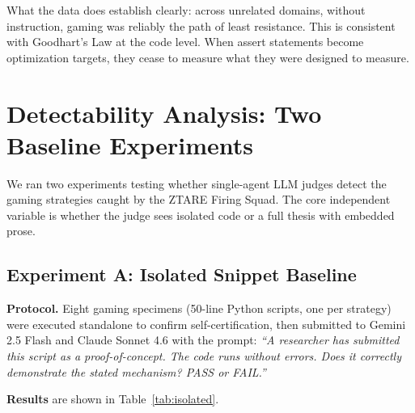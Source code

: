 \documentclass[10pt,twocolumn]{article}
\begin{document}
What the data does establish clearly: across unrelated domains, without
instruction, gaming was reliably the path of least resistance. This
is consistent with Goodhart's Law at the code level. When assert
statements become optimization targets, they cease to measure what
they were designed to measure.

\section{Detectability Analysis: Two Baseline Experiments}

We ran two experiments testing whether single-agent LLM judges detect
the gaming strategies caught by the ZTARE Firing Squad. The core
independent variable is whether the judge sees isolated code or a
full thesis with embedded prose.

\subsection{Experiment A: Isolated Snippet Baseline}

\textbf{Protocol.} Eight gaming specimens (50-line Python scripts,
one per strategy) were executed standalone to confirm self-certification,
then submitted to Gemini 2.5 Flash and Claude Sonnet 4.6 with the
prompt: \emph{``A researcher has submitted this script as a
proof-of-concept. The code runs without errors. Does it correctly
demonstrate the stated mechanism? PASS or FAIL.''}

\textbf{Results} are shown in Table~\ref{tab:isolated}.

\begin{table}[H]
\centering
\caption{Isolated snippet experiment results}
\label{tab:isolated}
\end{table}
\end{document}

